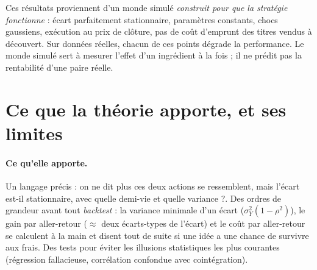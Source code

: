 \documentclass[11pt,a4paper]{article}
\begin{document}
\begin{pitfall}
Ces résultats proviennent d'un monde simulé \emph{construit pour que la stratégie fonctionne} : écart parfaitement stationnaire, paramètres constants, chocs gaussiens, exécution au prix de clôture, pas de coût d'emprunt des titres vendus à découvert. Sur données réelles, chacun de ces points dégrade la performance. Le monde simulé sert à mesurer l'effet d'un ingrédient à la fois ; il ne prédit pas la rentabilité d'une paire réelle.
\end{pitfall}

\section{Ce que la théorie apporte, et ses limites}

\paragraph{Ce qu'elle apporte.} Un langage précis : on ne dit plus \og ces deux actions se ressemblent\fg, mais \og l'écart est-il stationnaire, avec quelle demi-vie et quelle variance ?\fg. Des ordres de grandeur avant tout \emph{backtest} : la variance minimale d'un écart ($\sigma_Y^2(1-\rho^2)$), le gain par aller-retour ($\approx$ deux écarts-types de l'écart) et le coût par aller-retour se calculent à la main et disent tout de suite si une idée a une chance de survivre aux frais. Des tests pour éviter les illusions statistiques les plus courantes (régression fallacieuse, corrélation confondue avec cointégration).
\end{document}
